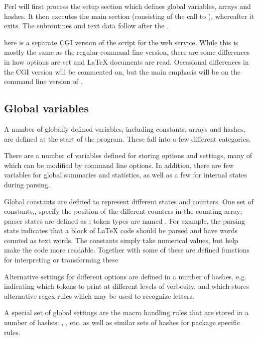 \documentclass{article}
\newcommand\wild{\ldots}
\def\CGI#1\CGIend{#1} %
\def\CGIend{}
\begin{document}
Perl will first process the setup section which defines global variables, arrays and hashes. It then executes the main section (consisting of the call to ), whereafter it exits. The subroutines and text data follow after the .

\CGI
There is a separate CGI version of the \TeXcount{} script for the web service. While this is mostly the same as the regular command line version, there are some differences in how options are set and \LaTeX{} documents are read. Occasional differences in the CGI version will be commented on, but the main emphasis will be on the command line version of \TeXcount{}.
\CGIend


\subsection{Global variables}

A number of globally defined variables, including constants, arrays and hashes, are defined at the start of the program. These fall into a few different categories.

There are a number of variables defined for storing options and settings, many of which can be modified by command line options. In addition, there are few variables for global summaries and statistics, as well as a few for internal states during parsing.

Global constants are defined to represent different states and counters. One set of constants,\code{\$CNT_\wild}, specify the position of the different counters in the counting array; parser states are defined as \code{\$STATE_\wild}; token types are named \code{\$TOKEN_\wild}. For example, the parsing state  indicates that a block of \LaTeX{} code should be parsed and have words counted as text words. The constants simply take numerical values, but help make the code more readable. Together with some of these are defined functions for interpreting or transforming these

Alternative settings for different options are defined in a number of hashes, e.g.  indicating which tokens to print at different levels of verbosity, and  which stores alternative regex rules which may be used to recognize letters.

A special set of global settings are the macro handling rules that are stored in a number of hashes: , , etc. as well as similar sets of hashes for package specific rules.
\end{document}

